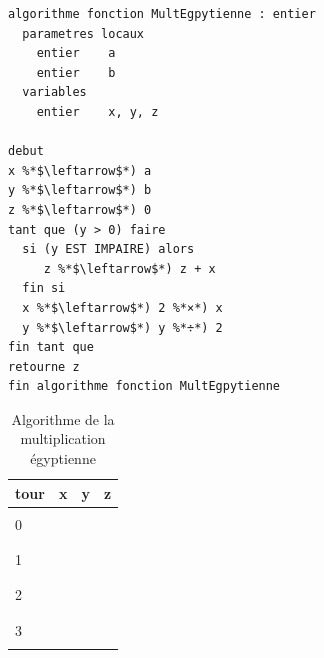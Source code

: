 \documentclass[11pt,a4paper]{article}
\begin{document}
\begin{table}[h!]
  \centering
  \begin{minipage}{0.59\textwidth}
    \centering
\begin{lstlisting}[style=algorithmique]
algorithme fonction MultEgpytienne : entier
  parametres locaux
    entier    a
    entier    b
  variables
    entier    x, y, z

debut
x %*$\leftarrow$*) a
y %*$\leftarrow$*) b
z %*$\leftarrow$*) 0
tant que (y > 0) faire
  si (y EST IMPAIRE) alors
     z %*$\leftarrow$*) z + x
  fin si
  x %*$\leftarrow$*) 2 %*×*) x
  y %*$\leftarrow$*) y %*÷*) 2
fin tant que
retourne z
fin algorithme fonction MultEgpytienne \end{lstlisting}
  \end{minipage}
  \hfillx
  \begin{minipage}{0.4\textwidth}
    \centering
    \begin{tabular}{|C{1cm}|C{1cm}|C{1cm}|C{1cm}|}
        \hline
        tour &  x &  y &  z  \\
        \hline
             &    &    &   \\
        0    &    &    &     \\
             &    &    &   \\
        \hline
             &    &    &   \\
        1    &    &    &     \\
             &    &    &   \\
        \hline
             &    &    &   \\
        2    &    &    &     \\
             &    &    &   \\
        \hline
             &    &    &   \\
        3    &    &    &     \\
             &    &    &   \\
        \hline
    \end{tabular}
  \end{minipage}
  \caption{Algorithme de la multiplication égyptienne}
  \label{multiplication-egyptienne}
\end{table}
\end{document}
